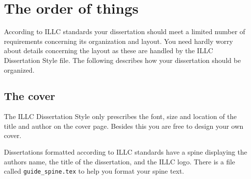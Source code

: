 
\chapter{The order of things}
According to ILLC standards your dissertation should meet a limited number
of requirements concerning its organization and layout. You need hardly 
worry about details concerning the layout as these are handled by the
ILLC Dissertation Style file. The following describes how your dissertation
should be organized.

\section{The cover}
The ILLC Dissertation Style only prescribes the font, size and location 
of the title and author on the cover page. Besides this you are free to 
design your own cover.

Dissertations formatted according to ILLC standards have a spine displaying
the authors name, the title of the dissertation, and the ILLC logo.
There is a file called {\tt guide\_spine.tex} to help you format 
your spine text.


